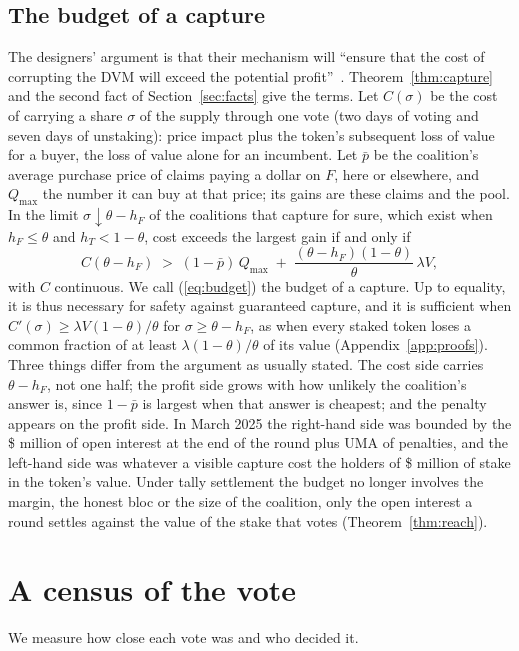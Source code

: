 \documentclass[conference,compsoc]{IEEEtran}
\newcommand{\hF}{h_{F}}
\newcommand{\hT}{h_{T}}
\begin{document}
\subsection{The budget of a capture}
\label{sec:identity}
 The designers' argument is that their mechanism will ``ensure that the cost of corrupting the DVM will exceed the potential profit''~\cite{umaecon}. Theorem~\ref{thm:capture} and the second fact of Section~\ref{sec:facts} give the terms. Let $C(\sigma)$ be the cost of carrying a share $\sigma$ of the supply through one vote (two days of voting and seven days of unstaking): price impact plus the token's subsequent loss of value for a buyer, the loss of value alone for an incumbent. Let $\bar p$ be the coalition's average purchase price of claims paying a dollar on $F$, here or elsewhere, and $Q_{\max}$ the number it can buy at that price; its gains are these claims and the pool. In the limit $\sigma \downarrow \theta - \hF$ of the coalitions that capture for sure, which exist when $\hF \le \theta$ and $\hT < 1 - \theta$, cost exceeds the largest gain if and only if
\begin{equation}
\label{eq:budget}
C(\theta - \hF) \;>\; (1 - \bar p)\,Q_{\max} \;+\; \frac{(\theta - \hF)(1-\theta)}{\theta}\,\lambda V ,
\end{equation}
with $C$ continuous. We call (\ref{eq:budget}) the budget of a capture. Up to equality, it is thus necessary for safety against guaranteed capture, and it is sufficient when $C'(\sigma) \ge \lambda V(1-\theta)/\theta$ for $\sigma \ge \theta - \hF$, as when every staked token loses a common fraction of at least $\lambda(1-\theta)/\theta$ of its value (Appendix~\ref{app:proofs}). Three things differ from the argument as usually stated. The cost side carries $\theta - \hF$, not one half; the profit side grows with how unlikely the coalition's answer is, since $1 - \bar p$ is largest when that answer is cheapest; and the penalty appears on the profit side. In March 2025 the right-hand side was bounded by the \$\marchOIM{} million of open interest at the end of the round plus \marchWhaleGain{} UMA of penalties, and the left-hand side was whatever a visible capture cost the holders of \$\marchWhaleUsdM{} million of stake in the token's value. Under tally settlement the budget no longer involves the margin, the honest bloc or the size of the coalition, only the open interest a round settles against the value of the stake that votes (Theorem~\ref{thm:reach}).

\section{A census of the vote}
\label{sec:census}
We measure how close each vote was and who decided it.
\end{document}

